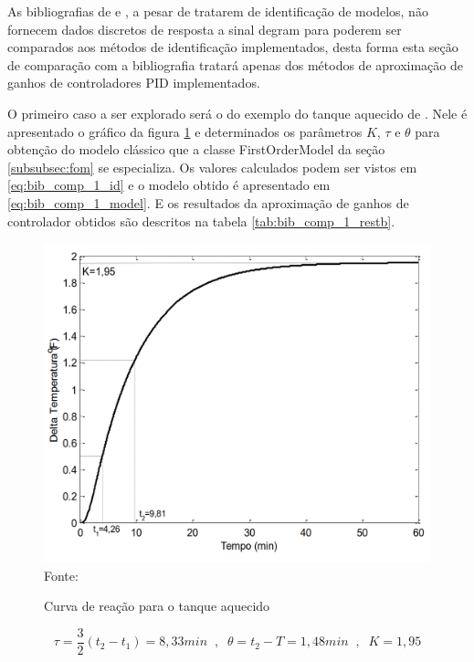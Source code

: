 As bibliografias de \cite{ogata2010engenharia} e \cite{CoelhoIdentificacao}, a pesar de tratarem de identificação de
modelos, não fornecem dados discretos de resposta a sinal degram para poderem ser comparados aos métodos de
identificação implementados, desta forma esta seção de comparação com a bibliografia tratará apenas dos métodos de
aproximação de ganhos de controladores PID implementados.

O primeiro caso a ser explorado será o do exemplo do tanque aquecido de \cite{apostpidsint}.
Nele é apresentado o gráfico da figura \ref{fig:bib_comp_1_graph} e determinados os parâmetros $K$, $\tau$ e $\theta$ para
obtenção do modelo clássico que a classe FirstOrderModel da seção \ref{subsubsec:fom} se especializa.
Os valores calculados podem ser vistos em \ref{eq:bib_comp_1_id} e o modelo obtido é apresentado em
\ref{eq:bib_comp_1_model}.
E os resultados da aproximação de ganhos de controlador obtidos são descritos na tabela \ref{tab:bib_comp_1_restb}.


\begin{figure}[H]
    \centering
    \caption{Curva de reação para o tanque aquecido}
    \includegraphics[scale=0.4]{figuras/bib_comp_1_graph}
    \label{fig:bib_comp_1_graph}
    \\
    \vspace{0cm}\hspace{0cm}\small{Fonte: \cite{apostpidsint}}
\end{figure}

\begin{equation}
    \label{eq:bib_comp_1_id}
    \tau = \frac{3}{2}(t_2 - t_1) = 8,33min \;\;,\;\; \theta = t_2 - T = 1,48min \;\;,\;\; K=1,95
\end{equation}

